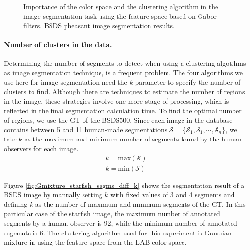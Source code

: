 \begin{figure}[!ht]
	\caption{Importance of the color space and the clustering algorithm in the image segmentation task using the feature space based on Gabor filters. BSDS pheasant image segmentation results.}\label{fig:pheasant_clustering_method_v_colorspace}    
\end{figure}



\paragraph{Number of clusters in the data.} 
Determining the number of segments to detect when using a clustering algotihms as image segmentation technique, is a frequent problem. The four algorithms we use here for image segmentation need the $k$ parameter to specify the number of clusters to find. Although there are techniques to estimate the number of regions in the image, these strategies involve one more stage of processing, which is reflected in the final segmentation calculation time. To find the optimal number of regions, we use the GT of the BSDS500. Since each image in the database contains between 5 and 11 human-made segmentations $\mathcal{S}=\{\mathcal{S}_1, \mathcal{S}_1, \cdots, \mathcal{S}_n\}$, we take $k$ as the maximum and minimum number of segments found by the human observers for each image. 
\begin{eqnarray}
	k = \mathrm{max}(\mathcal{S}) \\
	k = \mathrm{min}(\mathcal{S})
\end{eqnarray}

Figure \ref{fig:Gmixture_starfish_segms_diff_k} shows the segmentation result of a BSDS image by manually setting $k$ with fixed values of 3 and 4 segments and defining $k$ as the number of maximum and minimum segments of the GT. In this particular case of the starfish image, the maximum number of annotated segments by a human observer is 92, while the minimum number of annotated segments is 6. The clustering algorithm used for this experiment is Gaussian mixture in using the feature space from the LAB color space.


